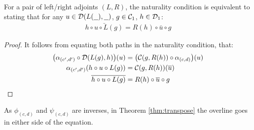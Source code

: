 \begin{theorem}
  For a pair of left/right adjoints $(L, R)$, the naturality condition is
  equivalent to stating that for any $u\in \mathcal{D}(L(\underline{\ \ }), \underline{\ \ })$, $g \in \mathcal{C}_1$,
  $h\in \mathcal{D}_1$:
  \begin{align*}
    \bar{h\circ u \circ L(g)} = R(h) \circ \bar{u} \circ g
  \end{align*}

  \begin{proof}
    It follows from equating both paths in the naturality condition, that:
    \[
      \begin{aligned}
      \big(\alpha_{(c', d')} \circ \mathcal{D}(L(g), h)\big)(u)
        &= \big(\mathcal{C}(g, R(h)) \circ \alpha_{(c, d)}\big)(u)\\
      \alpha_{(c', d')}(h\circ u \circ L(g))
        &= \mathcal{C}(g, R(h))(\overline{u})\\
      \overline{h\circ u \circ L(g)}
        &= R(h) \circ \overline{u} \circ g
      \end{aligned}
    \]
  \end{proof}
\end{theorem}

\begin{remark}
  As $\phi_{(c, d)}$ and $\psi_{(c, d)}$ are inverses, in Theorem
  \ref{thm:transpose} the overline goes in either side of the equation.
\end{remark}

